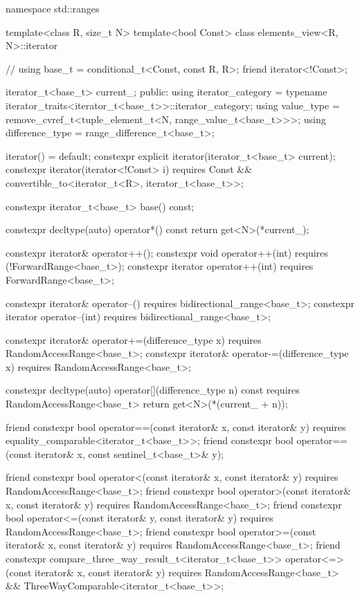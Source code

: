 \begin{codeblock}
namespace std::ranges {
  template<class R, size_t N>
  template<bool Const>
  class elements_view<R, N>::iterator {                 // \expos
    using base_t = conditional_t<Const, const R, R>;
    friend iterator<!Const>;

    iterator_t<base_t> current_;
  public:
    using iterator_category = typename iterator_traits<iterator_t<base_t>>::iterator_category;
    using value_type = remove_cvref_t<tuple_element_t<N, range_value_t<base_t>>>;
    using difference_type = range_difference_t<base_t>;

    iterator() = default;
    constexpr explicit iterator(iterator_t<base_t> current);
    constexpr iterator(iterator<!Const> i)
      requires Const && convertible_to<iterator_t<R>, iterator_t<base_t>>;

    constexpr iterator_t<base_t> base() const;

    constexpr decltype(auto) operator*() const
    { return get<N>(*current_); }

    constexpr iterator& operator++();
    constexpr void operator++(int) requires (!ForwardRange<base_t>);
    constexpr iterator operator++(int) requires ForwardRange<base_t>;

    constexpr iterator& operator--() requires bidirectional_range<base_t>;
    constexpr iterator operator--(int) requires bidirectional_range<base_t>;

    constexpr iterator& operator+=(difference_type x)
      requires RandomAccessRange<base_t>;
    constexpr iterator& operator-=(difference_type x)
      requires RandomAccessRange<base_t>;

    constexpr decltype(auto) operator[](difference_type n) const
      requires RandomAccessRange<base_t>
    { return get<N>(*(current_ + n)); }

    friend constexpr bool operator==(const iterator& x, const iterator& y)
      requires equality_comparable<iterator_t<base_t>>;
    friend constexpr bool operator==(const iterator& x, const sentinel_t<base_t>& y);

    friend constexpr bool operator<(const iterator& x, const iterator& y)
      requires RandomAccessRange<base_t>;
    friend constexpr bool operator>(const iterator& x, const iterator& y)
      requires RandomAccessRange<base_t>;
    friend constexpr bool operator<=(const iterator& y, const iterator& y)
      requires RandomAccessRange<base_t>;
    friend constexpr bool operator>=(const iterator& x, const iterator& y)
      requires RandomAccessRange<base_t>;
    friend constexpr compare_three_way_result_t<iterator_t<base_t>>
      operator<=>(const iterator& x, const iterator& y)
        requires RandomAccessRange<base_t> && ThreeWayComparable<iterator_t<base_t>>;

}}
\end{codeblock}
